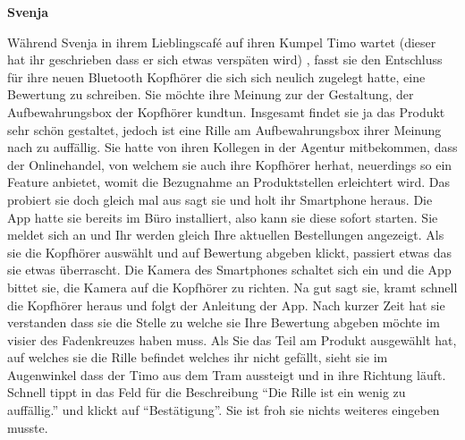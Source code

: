 \vspace{2mm}
\textbf{Svenja}

Während Svenja in ihrem Lieblingscafé auf ihren Kumpel Timo wartet (dieser hat ihr
geschrieben dass er sich etwas verspäten wird) , fasst sie den Entschluss für ihre neuen
Bluetooth Kopfhörer die sich sich neulich zugelegt hatte, eine Bewertung zu schreiben. Sie
möchte ihre Meinung zur der Gestaltung, der Aufbewahrungsbox der Kopfhörer kundtun.
Insgesamt findet sie ja das Produkt sehr schön gestaltet, jedoch ist eine Rille am
Aufbewahrungsbox ihrer Meinung nach zu auffällig. Sie hatte von ihren Kollegen in der
Agentur mitbekommen, dass der Onlinehandel, von welchem sie auch ihre Kopfhörer herhat,
neuerdings so ein Feature anbietet, womit die Bezugnahme an Produktstellen erleichtert
wird.
Das probiert sie doch gleich mal aus sagt sie und holt ihr Smartphone heraus. Die App hatte
sie bereits im Büro installiert, also kann sie diese sofort starten. Sie meldet sich an und Ihr
werden gleich Ihre aktuellen Bestellungen angezeigt. Als sie die Kopfhörer auswählt und auf
Bewertung abgeben klickt, passiert etwas das sie etwas überrascht. Die Kamera des
Smartphones schaltet sich ein und die App bittet sie, die Kamera auf die Kopfhörer zu
richten. Na gut sagt sie, kramt schnell die Kopfhörer heraus und folgt der Anleitung der App.
Nach kurzer Zeit hat sie verstanden dass sie die Stelle zu welche sie Ihre Bewertung
abgeben möchte im visier des Fadenkreuzes haben muss. Als Sie das Teil am Produkt
ausgewählt hat, auf welches sie die Rille befindet welches ihr nicht gefällt, sieht sie im
Augenwinkel dass der Timo aus dem Tram aussteigt und in ihre Richtung läuft. Schnell tippt
in das Feld für die Beschreibung “Die Rille ist ein wenig zu auffällig.” und klickt auf
“Bestätigung”. Sie ist froh sie nichts weiteres eingeben musste.





